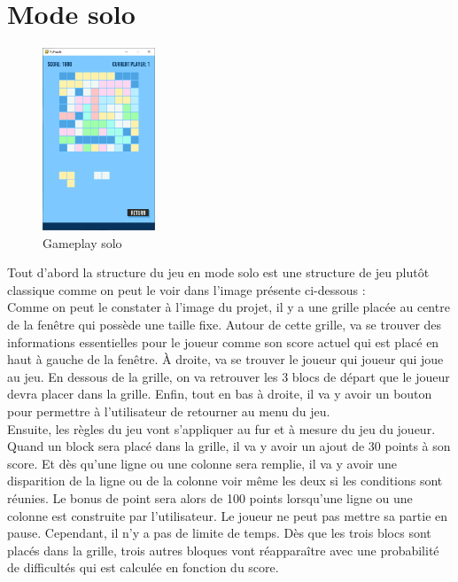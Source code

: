 \documentclass[a4paper]{report}
\begin{document}
\section{Mode solo}
\begin{figure}
    \centering
    \includegraphics[width=0.3\textwidth, trim=0pt 0pt 0pt 30pt]{images/3-ingame.png}
    \caption{Gameplay solo}
\end{figure}
Tout d'abord la structure du jeu en mode solo est une structure de jeu plutôt classique comme on peut le voir dans l'image présente ci-dessous :\\

Comme on peut le constater à l'image du projet, il y a une grille placée au centre de la fenêtre qui possède une taille fixe. Autour de cette grille, va se trouver des informations essentielles pour le joueur comme son score actuel qui est placé en haut à gauche de la fenêtre. À droite, va se trouver le joueur qui joueur qui joue au jeu. En dessous de la grille, on va retrouver les 3 blocs de départ que le joueur devra placer dans la grille. Enfin, tout en bas à droite, il va y avoir un bouton pour permettre à l'utilisateur de retourner au menu du jeu. \\

Ensuite, les règles du jeu vont s'appliquer au fur et à mesure du jeu du joueur. Quand un block sera placé dans la grille, il va y avoir un ajout de 30 points à son score. Et dès qu'une ligne ou une colonne sera remplie, il va y avoir une disparition de la ligne ou de la colonne voir même les deux si les conditions sont réunies. Le bonus de point sera alors de 100 points lorsqu'une ligne ou une colonne est construite par l'utilisateur. Le joueur ne peut pas mettre sa partie en pause. Cependant, il n'y a pas de limite de temps. Dès que les trois blocs sont placés dans la grille, trois autres bloques vont réapparaître avec une probabilité de difficultés qui est calculée en fonction du score. \\
\end{document}
